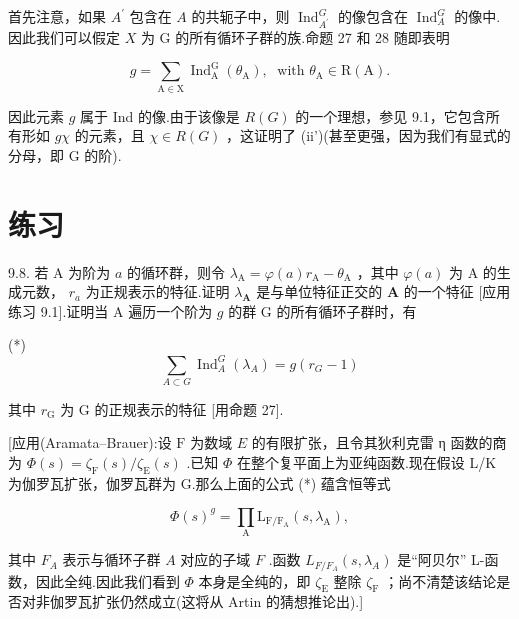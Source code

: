 \documentclass[10pt]{article}
\begin{document}
首先注意，如果 \({A}^{\prime }\) 包含在 \(A\) 的共轭子中，则 \({\operatorname{Ind}}_{{A}^{\prime }}^{G}\) 的像包含在 \({\operatorname{Ind}}_{A}^{G}\) 的像中.因此我们可以假定 \(X\) 为 G 的所有循环子群的族.命题 27 和 28 随即表明

\[
g = \mathop{\sum }\limits_{{\mathrm{A} \in  \mathrm{X}}}{\operatorname{Ind}}_{\mathrm{A}}^{\mathrm{G}}\left( {\theta }_{\mathrm{A}}\right) ,\;\text{ with }{\theta }_{\mathrm{A}} \in  \mathrm{R}\left( \mathrm{A}\right) .
\]

因此元素 \(g\) 属于 Ind 的像.由于该像是 \(R\left( G\right)\) 的一个理想，参见 9.1，它包含所有形如 \({g\chi }\) 的元素，且 \(\chi  \in  R\left( G\right)\) ，这证明了 (ii')(甚至更强，因为我们有显式的分母，即 \(\mathrm{G}\) 的阶).

\section*{练习}

9.8. 若 \(\mathrm{A}\) 为阶为 \(a\) 的循环群，则令 \({\lambda }_{\mathrm{A}} = \varphi \left( a\right) {r}_{\mathrm{A}} - {\theta }_{\mathrm{A}}\) ，其中 \(\varphi \left( a\right)\) 为 \(\mathrm{A}\) 的生成元数， \({r}_{a}\) 为正规表示的特征.证明 \({\lambda }_{\mathbf{A}}\) 是与单位特征正交的 \(\mathbf{A}\) 的一个特征 [应用练习 9.1].证明当 A 遍历一个阶为 \(g\) 的群 G 的所有循环子群时，有

(*)
\[
\mathop{\sum }\limits_{{A \subset  G}}{\operatorname{Ind}}_{A}^{G}\left( {\lambda }_{A}\right)  = g\left( {{r}_{G} - 1}\right)
\]

其中 \({r}_{\mathrm{G}}\) 为 \(\mathrm{G}\) 的正规表示的特征 [用命题 27].

[应用(Aramata–Brauer):设 \(\mathrm{F}\) 为数域 \(E\) 的有限扩张，且令其狄利克雷 η 函数的商为 \(\Phi \left( s\right)  = {\zeta }_{\mathrm{F}}\left( s\right) /{\zeta }_{\mathrm{E}}\left( s\right)\) .已知 \(\Phi\) 在整个复平面上为亚纯函数.现在假设 L/K 为伽罗瓦扩张，伽罗瓦群为 G.那么上面的公式 (*) 蕴含恒等式

\[
\Phi {\left( s\right) }^{g} = \mathop{\prod }\limits_{\mathrm{A}}{\mathrm{L}}_{\mathrm{F}/{\mathrm{F}}_{\mathrm{A}}}\left( {s,{\lambda }_{\mathrm{A}}}\right) ,
\]

其中 \({F}_{A}\) 表示与循环子群 \(A\) 对应的子域 \(F\) .函数 \({L}_{F/{F}_{A}}\left( {s,{\lambda }_{A}}\right)\) 是“阿贝尔” L-函数，因此全纯.因此我们看到 \(\Phi\) 本身是全纯的，即 \({\zeta }_{\mathrm{E}}\) 整除 \({\zeta }_{\mathrm{F}}\) ；尚不清楚该结论是否对非伽罗瓦扩张仍然成立(这将从 Artin 的猜想推论出).]
\end{document}
